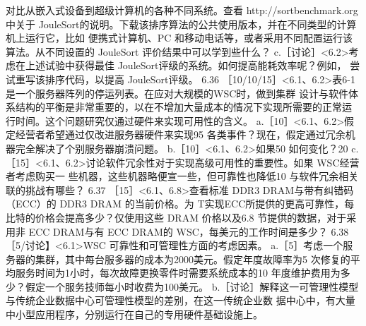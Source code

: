 对比从嵌入式设备到超级计算机的各种不同系统。查看 http://sortbenchmark.org 中关于
JouleSort的说明。下载该排序算法的公共使用版本，并在不同类型的计算机上运行它，比如
便携式计算机、PC 和移动电话等，或者采用不同配置运行该算法。从不同设置的 JouleSort
评价结果中可以学到些什么？
c.［讨论］<6.2>考虑在上述试验中获得最佳 JouleSort评级的系统。如何提高能耗效率呢？例如，
尝试重写该排序代码，以提高 JouleSort评级。
6.36
［10/10/15］<6.1、6.2>表6-1 是一个服务器阵列的停运列表。在应对大规模的WSC时，做到集群
设计与软件体系结构的平衡是非常重要的，以在不增加大量成本的情况下实现所需要的正常运
行时间。这个问题研究仅通过硬件来实现可用性的含义。
a.［10］<6.1、6.2>假定经营者希望通过仅改进服务器硬件来实现95%
各类事件？现在，假定通过冗余机器完全解决了个别服务器崩溃问题。
b.［10］<6.1、6.2>如果50%
如何变化？20%
c.［15］<6.1、6.2>讨论软件冗余性对于实现高级可用性的重要性。如果 WSC经营者考虑购买一
些机器，这些机器略便宣一些，但可靠性也降低10%
与软件冗余相关联的挑战有哪些？
6.37 ［15］<6.1、6.8>查看标准 DDR3 DRAM与带有纠错码（ECC）的 DDR3 DRAM 的当前价格。为
T实现ECC所提供的更高可靠性，每比特的价格会提高多少？仅使用这些 DRAM 价格以及6.8
节提供的数据，对于采用非 ECC DRAM与有 ECC DRAM的 WSC，每美元的工作时间是多少？
6.38 ［5/讨论】<6.1>WSC 可靠性和可管理性方面的考虑因素。
a.［5］考虑一个服务器的集群，其中每台服多器的成本为2000美元。假定年度故障率为5%
次修复的平均服务时间为1小时，每次故障更换零件时需要系统成本的10%
年度维护费用为多少？假定一个服务技师每小时收费为100美元。
b.［讨论］解释这一可管理性模型与传统企业数据中心可管理性模型的差别，在这一传统企业数
据中心中，有大量中小型应用程序，分别运行在自己的专用硬件基础设施上。